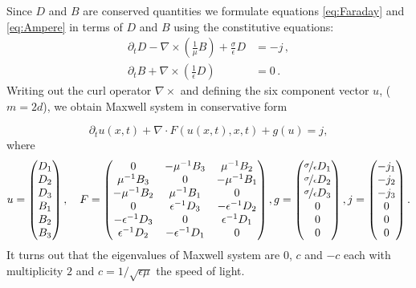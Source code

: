 \documentclass[a4paper,12pt]{article}
\theoremstyle{definition}
\theoremstyle{definition}
\begin{document}
Since $D$ and $B$ are conserved quantities we formulate equations \eqref{eq:Faraday} and
\eqref{eq:Ampere} in terms of $D$ and $B$ using the constitutive equations:
\begin{subequations}
	\begin{align}
	\partial_t D - \nabla\times\left(\frac{1}{\mu} B\right) + \frac{\sigma}{\epsilon} D &= - j\,,  \\
	\partial_t B + \nabla\times\left( \frac{1}{\epsilon} D \right) &= 0\, .
	\end{align}
\end{subequations}
Writing out the curl operator $\nabla\times$ and defining the six component
vector $u$, ($m=2d$), we obtain Maxwell system in conservative form

$$\partial_t u(x,t) + \nabla\cdot F(u(x,t),x,t) + g(u)= j,$$
where
$$u = \begin{pmatrix}
D_1\\
D_2\\
D_3\\
B_1\\
B_2\\
B_3
\end{pmatrix} ,\quad
F= \left( \begin{matrix}
0  & -\mu^{-1}B_3 & \mu^{-1}B_2\\
\mu^{-1}B_3 & 0 & -\mu^{-1}B_1\\
-\mu^{-1}B_2 & \mu^{-1}B_1 & 0\\
0  & \epsilon^{-1}D_3 & -\epsilon^{-1}D_2\\
-\epsilon^{-1}D_3 & 0 & \epsilon^{-1}D_1\\
\epsilon^{-1}D_2 & -\epsilon^{-1}D_1 & 0\\
\end{matrix} \right),
g = \begin{pmatrix}
\nicefrac{\sigma}{\epsilon}D_1\\
\nicefrac{\sigma}{\epsilon}D_2\\
\nicefrac{\sigma}{\epsilon}D_3\\
0\\
0\\
0
\end{pmatrix},
j = \begin{pmatrix}
-j_1\\
-j_2\\
-j_3\\
0\\
0\\
0
\end{pmatrix}.
$$
It turns out that the eigenvalues
of Maxwell system are $0$, $c$ and $-c$ each with
multiplicity $2$ and $c=1/\sqrt{\epsilon\mu}$ the speed of light.
\end{document}
